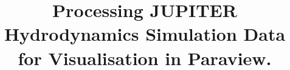 \documentclass[preprint2]{aastex62}
\begin{document}
\title{Processing JUPITER Hydrodynamics Simulation Data for Visualisation in Paraview.}


\end{document}

